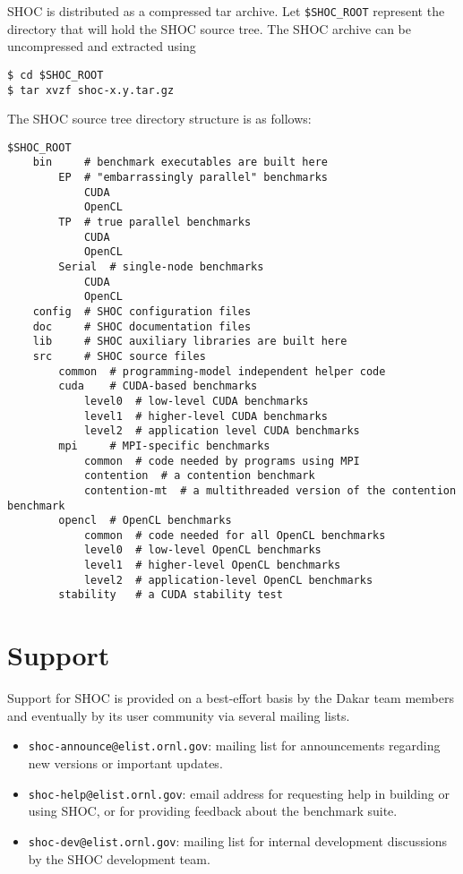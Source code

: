 \documentclass[11pt]{article}
\begin{document}
SHOC is distributed as a compressed tar archive.
Let \verb+$SHOC_ROOT+ represent the directory that will hold the SHOC source
tree.
The SHOC archive can be uncompressed and extracted using 
\begin{Verbatim}[frame=single]
$ cd $SHOC_ROOT
$ tar xvzf shoc-x.y.tar.gz
\end{Verbatim}

\pagebreak

The SHOC source tree directory structure is as follows:

\begin{Verbatim}[frame=single]
$SHOC_ROOT
    bin     # benchmark executables are built here
        EP  # "embarrassingly parallel" benchmarks
            CUDA
            OpenCL
        TP  # true parallel benchmarks
            CUDA
            OpenCL
        Serial  # single-node benchmarks
            CUDA
            OpenCL
    config  # SHOC configuration files
    doc     # SHOC documentation files
    lib     # SHOC auxiliary libraries are built here
    src     # SHOC source files
        common  # programming-model independent helper code
        cuda    # CUDA-based benchmarks
            level0  # low-level CUDA benchmarks
            level1  # higher-level CUDA benchmarks
            level2  # application level CUDA benchmarks
        mpi     # MPI-specific benchmarks
            common  # code needed by programs using MPI
            contention  # a contention benchmark
            contention-mt  # a multithreaded version of the contention benchmark
        opencl  # OpenCL benchmarks
            common  # code needed for all OpenCL benchmarks
            level0  # low-level OpenCL benchmarks
            level1  # higher-level OpenCL benchmarks
            level2  # application-level OpenCL benchmarks
        stability   # a CUDA stability test
\end{Verbatim}

\section{Support}\label{sec:support}

Support for SHOC is provided on a best-effort basis by the Dakar team members
and eventually by its user community via several mailing lists.
\begin{itemize}
\item \verb+shoc-announce@elist.ornl.gov+: mailing list for announcements
regarding new versions or important updates.
\item \verb+shoc-help@elist.ornl.gov+: email address for requesting
help in building or using SHOC, or for providing feedback about the benchmark 
suite.
\item \verb+shoc-dev@elist.ornl.gov+: mailing list for internal 
development discussions by the SHOC development team.
\end{itemize}
\end{document}
